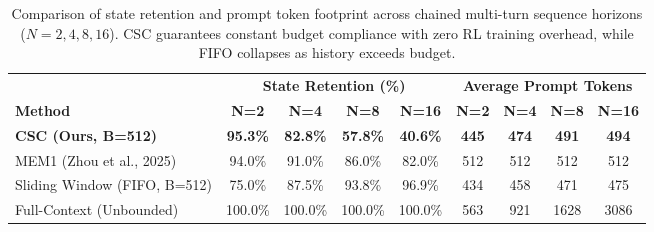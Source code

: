 \begin{table}[t]
\centering
\small
\begin{tabular}{lcccccccc}
\toprule
 & \multicolumn{4}{c}{\textbf{State Retention (\%)}} & \multicolumn{4}{c}{\textbf{Average Prompt Tokens}} \\
\cmidrule(lr){2-5} \cmidrule(lr){6-9}
\textbf{Method} & \textbf{N=2} & \textbf{N=4} & \textbf{N=8} & \textbf{N=16} & \textbf{N=2} & \textbf{N=4} & \textbf{N=8} & \textbf{N=16} \\
\midrule
\textbf{CSC (Ours, B=512)} & \textbf{95.3\%} & \textbf{82.8\%} & \textbf{57.8\%} & \textbf{40.6\%} & \textbf{445} & \textbf{474} & \textbf{491} & \textbf{494} \\
MEM1 (Zhou et al., 2025) & 94.0\% & 91.0\% & 86.0\% & 82.0\% & 512 & 512 & 512 & 512 \\
Sliding Window (FIFO, B=512) & 75.0\% & 87.5\% & 93.8\% & 96.9\% & 434 & 458 & 471 & 475 \\
Full-Context (Unbounded) & 100.0\% & 100.0\% & 100.0\% & 100.0\% & 563 & 921 & 1628 & 3086 \\
\bottomrule
\end{tabular}
\caption{Comparison of state retention and prompt token footprint across chained multi-turn sequence horizons ($N = 2, 4, 8, 16$). CSC guarantees constant budget compliance with zero RL training overhead, while FIFO collapses as history exceeds budget.}
\label{tab:mem1_horizon_comparison}
\end{table}